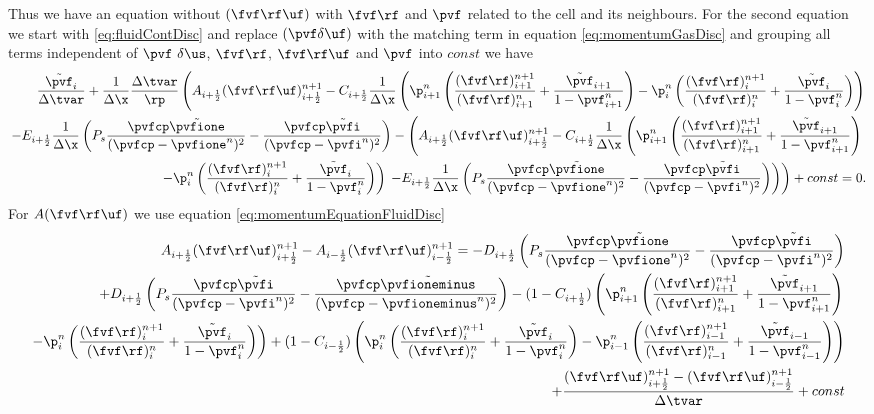 Thus we have an equation without $(\fvf \rf \uf)$ with $\fvf \rf$ and $\pvf$ related to the cell and its neighbours. 
For the second equation we start with \eqref{eq:fluidContDisc} and replace $(\pvf \delta \uf)$ with the matching term in equation \eqref{eq:momentumGasDisc} and grouping all terms independent of $\pvf \ \delta \us$, $\fvf \rf $, $\fvf \rf \uf$ and $\pvf$ into $const$ we have
\begin{align*}
     \dfrac{\tilde{\pvf}_i}{\Delta \tvar} + \dfrac{1}{\Delta \x}  \dfrac{\Delta \tvar}{\rp}
    \left( A_{i+\frac{1}{2}} (\fvf \rf \uf)_{i+\frac{1}{2}}^{n+1} - C_{i+\frac{1}{2}} \dfrac{1}{\Delta \x}
    \left( \p_{i+1}^n \left( \dfrac{(\fvf \rf)_{i+1}^{n+1}}{(\fvf \rf)_{i+1}^n} + \dfrac{\tilde{\pvf}_{i+1}}{1 - \pvf_{i+1}^n}\right)
     - \p_{i}^n \left( \dfrac{(\fvf \rf)_{i}^{n+1}}{(\fvf \rf)_{i}^n} + \dfrac{\tilde{\pvf}_{i}}{1 - \pvf_{i}^n} \right)\right) \right.
    \\ \left.- E_{i+\frac{1}{2}} \dfrac{1}{\Delta \x}\left(
    P_s \dfrac{\pvfcp \tilde{\pvfione}}{(\pvfcp - \pvfione^n)^2} - \dfrac{\pvfcp \tilde{\pvfi}}{(\pvfcp - \pvfi^n)^2}
    \right) - 
    \left(
    A_{i+\frac{1}{2}} (\fvf \rf \uf)_{i+\frac{1}{2}}^{n+1} - C_{i+\frac{1}{2}} \dfrac{1}{\Delta \x}
    \left( \p_{i+1}^n \left( \dfrac{(\fvf \rf)_{i+1}^{n+1}}{(\fvf \rf)_{i+1}^n} + \dfrac{\tilde{\pvf}_{i+1}}{1 - \pvf_{i+1}^n}\right) 
    \right. \right. \right.
    \\
     \left. \left. \left.
     - \p_{i}^n \left( \dfrac{(\fvf \rf)_{i}^{n+1}}{(\fvf \rf)_{i}^n} + \dfrac{\tilde{\pvf}_{i}}{1 - \pvf_{i}^n} \right)\right) \right.
      \left.- E_{i+\frac{1}{2}} \dfrac{1}{\Delta \x}\left(
    P_s \dfrac{\pvfcp \tilde{\pvfione}}{(\pvfcp - \pvfione^n)^2} - \dfrac{\pvfcp \tilde{\pvfi}}{(\pvfcp - \pvfi^n)^2}
     \right)
     \right)
     \right) + const = 0.
\end{align*}
For $A (\fvf \rf \uf)$ we use equation \eqref{eq:momentumEquationFluidDisc} 
\begin{align*}
    A_{i+\frac{1}{2}} (\fvf \rf \uf)_{i+\frac{1}{2}}^{n+1} - A_{i-\frac{1}{2}} (\fvf \rf \uf)_{i-\frac{1}{2}}^{n+1} = 
    -D_{i+\frac{1}{2}} 
    \left( P_s \dfrac{\pvfcp \tilde{\pvfione}}{(\pvfcp - \pvfione^n)^2} - \dfrac{\pvfcp \tilde{\pvfi}}{(\pvfcp - \pvfi^n)^2} \right)  \\
    +D_{i+\frac{1}{2}} \left( P_s \dfrac{\pvfcp \tilde{\pvfi}}{(\pvfcp - \pvfi^n)^2} - \dfrac{\pvfcp \tilde{\pvfioneminus}}{(\pvfcp - \pvfioneminus^n)^2} \right) 
    -  (1 - C_{i+\frac{1}{2}}) \left( \p_{i+1}^n \left( \dfrac{(\fvf \rf)_{i+1}^{n+1}}{(\fvf \rf)_{i+1}^n} + \dfrac{\tilde{\pvf}_{i+1}}{1 - \pvf_{i+1}^n}\right) 
    \right.
    \\
    \left.
    - \p_{i}^n \left(\dfrac{(\fvf \rf)_{i}^{n+1}}{(\fvf \rf)_{i}^n} + \dfrac{\tilde{\pvf}_{i}}{1 - \pvf_{i}^n} \right)\right) 
    + (1 - C_{i-\frac{1}{2}}) \left( \p_{i}^n \left( \dfrac{(\fvf \rf)_{i}^{n+1}}{(\fvf \rf)_{i}^n} + \dfrac{\tilde{\pvf}_{i}}{1 - \pvf_{i}^n}\right) 
    - \p_{i-1}^n \left(\dfrac{(\fvf \rf)_{i-1}^{n+1}}{(\fvf \rf)_{i-1}^n} + \dfrac{\tilde{\pvf}_{i-1}}{1 - \pvf_{i-1}^n} \right)\right) \\ + \dfrac{(\fvf \rf \uf)_{i+\frac{1}{2}}^{n+1} - (\fvf \rf \uf)_{i-\frac{1}{2}}^{n+1}}{\Delta \tvar}
    + const
\end{align*}
